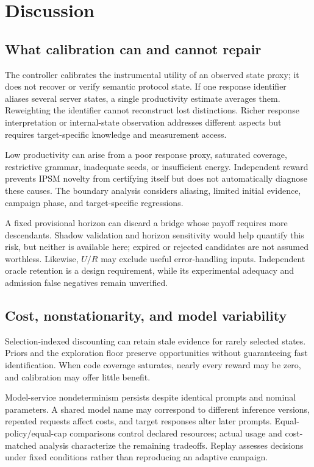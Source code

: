 \documentclass[final,5p,times,number]{elsarticle}
\begin{document}
\section{Discussion}
\subsection{What calibration can and cannot repair}
The controller calibrates the instrumental utility of an observed state proxy; it does not recover or verify semantic protocol state. If one response identifier aliases several server states, a single productivity estimate averages them. Reweighting the identifier cannot reconstruct lost distinctions. Richer response interpretation or internal-state observation addresses different aspects but requires target-specific knowledge and measurement access.

Low productivity can arise from a poor response proxy, saturated coverage, restrictive grammar, inadequate seeds, or insufficient energy. Independent reward prevents IPSM novelty from certifying itself but does not automatically diagnose these causes. The boundary analysis considers aliasing, limited initial evidence, campaign phase, and target-specific regressions.

A fixed provisional horizon can discard a bridge whose payoff requires more descendants. Shadow validation and horizon sensitivity would help quantify this risk, but neither is available here; expired or rejected candidates are not assumed worthless. Likewise, $U/R$ may exclude useful error-handling inputs. Independent oracle retention is a design requirement, while its experimental adequacy and admission false negatives remain unverified.

\subsection{Cost, nonstationarity, and model variability}
Selection-indexed discounting can retain stale evidence for rarely selected states. Priors and the exploration floor preserve opportunities without guaranteeing fast identification. When code coverage saturates, nearly every reward may be zero, and calibration may offer little benefit.

Model-service nondeterminism persists despite identical prompts and nominal parameters. A shared model name may correspond to different inference versions, repeated requests affect costs, and target responses alter later prompts. Equal-policy/equal-cap comparisons control declared resources; actual usage and cost-matched analysis characterize the remaining tradeoffs. Replay assesses decisions under fixed conditions rather than reproducing an adaptive campaign.
\end{document}
